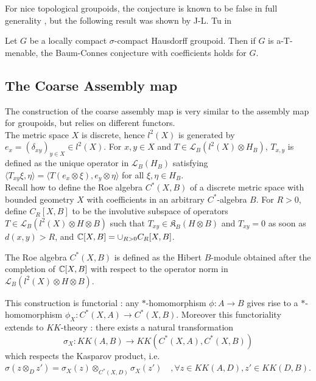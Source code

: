 For nice topological groupoids, the conjecture is known to be false in full generality \cite{HigsonLaffSk}, but the following result was shown by J-L. Tu in \cite{TuThese}
\begin{thm}\label{Tu}
Let $G$ be a locally compact $\sigma$-compact Hausdorff groupoid. Then if $G$ is a-T-menable, the Baum-Connes conjecture with coefficients holds for $G$.
\end{thm}

\subsection{The Coarse Assembly map}

The construction of the coarse assembly map is very similar to the assembly map for groupoids, but relies on different functors.\\

The metric space $X$ is discrete, hence $l^2(X)$ is generated by $e_x = (\delta_{xy})_{y\in X}\in l^2(X)$. For $x,y\in X$ and $T\in \mathcal L_B(l^2(X)\otimes H_B)$, $T_{x,y}$ is defined as the unique operator in $\mathcal L_B(H_B)$ satisfying $\langle T_{xy}\xi,\eta\rangle = \langle T (e_x\otimes \xi),e_y\otimes \eta \rangle$ for all $\xi,\eta\in H_B$.\\

Recall how to define the Roe algebra $C^*(X,B)$ of a discrete metric space with bounded geometry $X$ with coefficients in an arbitrary $C^*$-algebra $B$. For $R>0$, define $C_R[X,B]$ to be the involutive subspace of operators $T\in \mathcal L_B(l^2(X)\otimes H\otimes B)$ such that $T_{xy}\in \mathfrak K_B(H\otimes B)$ and $T_{xy}=0$ as soon as $d(x,y)>R$, and $\mathbb C[X,B]= \cup_{R>0} C_R[X,B]$. 

\begin{definition}
The Roe algebra $C^*(X,B)$ is defined as the Hibert $B$-module obtained after the completion of $\mathbb C[X,B]$ with respect to the operator norm in $\mathcal L_B(l^2(X)\otimes H\otimes B)$.
\end{definition} 

This construction is functorial : any $*$-homomorphism $\phi: A\rightarrow B$ gives rise to a $*$-homomorphism $\phi_X : C^*(X,A)\rightarrow C^*(X,B)$. Moreover this functoriality extends to $KK$-theory : there exists a natural transformation 
\[\sigma_X : KK(A,B)\rightarrow KK(C^*(X,A),C^*(X,B))\]
which respects the Kasparov product, i.e. $\sigma(z\otimes_D z')=\sigma_X(z)\otimes_{C^*(X,D)} \sigma_X(z')\quad,\forall z\in KK(A,D),z'\in KK(D,B)$.\\

